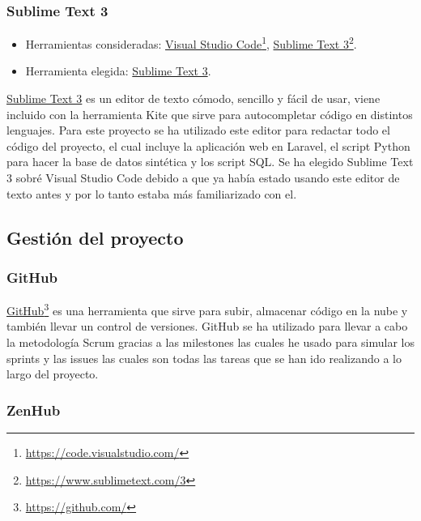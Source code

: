 \subsubsection{Sublime Text 3}

\begin{itemize}
    \item Herramientas consideradas: \href{https://code.visualstudio.com/}{Visual Studio Code}\footnote{\href{https://code.visualstudio.com/}{https://code.visualstudio.com/}}, \href{https://www.sublimetext.com/3}{Sublime Text 3}\footnote{\label{sublimefoot}\href{https://www.sublimetext.com/3}{https://www.sublimetext.com/3}}.
	\item Herramienta elegida: \href{https://www.sublimetext.com/3}{Sublime Text 3}.
\end{itemize}

\href{https://www.sublimetext.com/3}{Sublime Text 3} es un editor de texto cómodo, sencillo y fácil de usar, viene incluido con la herramienta Kite que sirve para autocompletar código en distintos lenguajes. Para este proyecto se ha utilizado este editor para redactar todo el código del proyecto, el cual incluye la aplicación web en Laravel, el script Python para hacer la base de datos sintética y los script SQL. Se ha elegido Sublime Text 3 sobré Visual Studio Code debido a que ya había estado usando este editor de texto antes y por lo tanto estaba más familiarizado con el. 

\subsection{Gestión del proyecto}

\subsubsection{GitHub}

\href{https://github.com/}{GitHub}\footnote{\href{https://github.com/}{https://github.com/}} es una herramienta que sirve para subir, almacenar código en la nube y también llevar un control de versiones. GitHub se ha utilizado para llevar a cabo la metodología Scrum gracias a las milestones las cuales he usado para simular los sprints y las issues las cuales son todas las tareas que se han ido realizando a lo largo del proyecto. 

\subsubsection{ZenHub}

